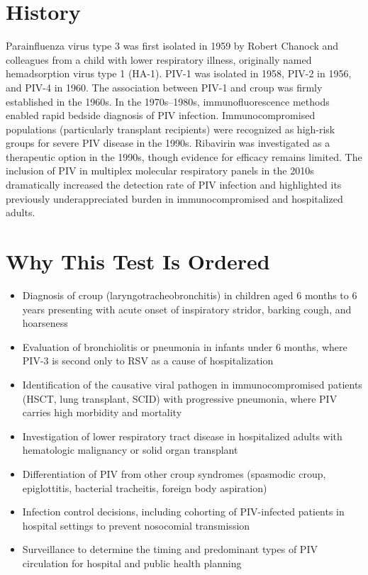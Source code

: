 \section*{History}
Parainfluenza virus type 3 was first isolated in 1959 by Robert Chanock and colleagues from a child with lower respiratory illness, originally named hemadsorption virus type 1 (HA-1). PIV-1 was isolated in 1958, PIV-2 in 1956, and PIV-4 in 1960. The association between PIV-1 and croup was firmly established in the 1960s. In the 1970s--1980s, immunofluorescence methods enabled rapid bedside diagnosis of PIV infection. Immunocompromised populations (particularly transplant recipients) were recognized as high-risk groups for severe PIV disease in the 1990s. Ribavirin was investigated as a therapeutic option in the 1990s, though evidence for efficacy remains limited. The inclusion of PIV in multiplex molecular respiratory panels in the 2010s dramatically increased the detection rate of PIV infection and highlighted its previously underappreciated burden in immunocompromised and hospitalized adults.

\section*{Why This Test Is Ordered}
\begin{itemize}
  \item Diagnosis of croup (laryngotracheobronchitis) in children aged 6 months to 6 years presenting with acute onset of inspiratory stridor, barking cough, and hoarseness
  \item Evaluation of bronchiolitis or pneumonia in infants under 6 months, where PIV-3 is second only to RSV as a cause of hospitalization
  \item Identification of the causative viral pathogen in immunocompromised patients (HSCT, lung transplant, SCID) with progressive pneumonia, where PIV carries high morbidity and mortality
  \item Investigation of lower respiratory tract disease in hospitalized adults with hematologic malignancy or solid organ transplant
  \item Differentiation of PIV from other croup syndromes (spasmodic croup, epiglottitis, bacterial tracheitis, foreign body aspiration)
  \item Infection control decisions, including cohorting of PIV-infected patients in hospital settings to prevent nosocomial transmission
  \item Surveillance to determine the timing and predominant types of PIV circulation for hospital and public health planning
\end{itemize}

